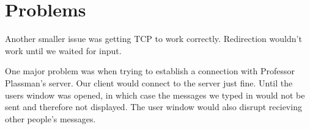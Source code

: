 \documentclass[12pt]{article}
\begin{document}
\section{Problems}
Another  smaller issue was getting TCP to work correctly. Redirection wouldn't work until we waited for input.

One major problem  was when trying to establish a connection with Professor Plassman's server. Our client would connect to the server just fine. Until the users window was opened, in which case the messages we typed in would not be sent and therefore not displayed. The user window would also disrupt recieving other people's messages.  
\end{document}
